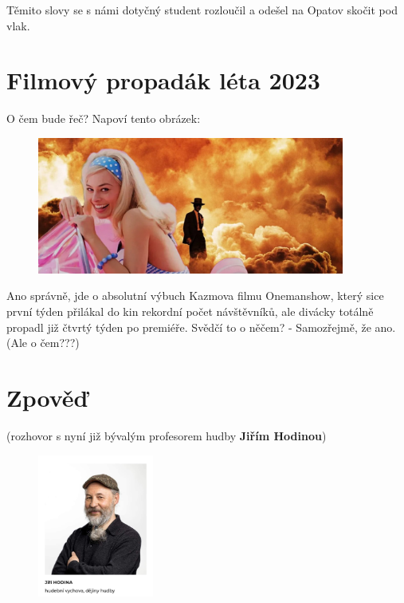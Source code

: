 \documentclass[twoside, 11pt]{article}
\begin{document}
Těmito slovy se s námi dotyčný student rozloučil a odešel na Opatov skočit pod vlak.

\section*{Filmový propadák léta 2023}
O čem bude řeč? Napoví tento obrázek:

\begin{figure}[htbp]
    \centering
    \includegraphics[width=0.9\textwidth]{barbie}
\end{figure}
\vspace*{-12pt}
{\scriptsize Ano správně, jde o absolutní výbuch Kazmova filmu Onemanshow, který sice první týden přilákal do kin rekordní počet návštěvníků, ale divácky totálně propadl již čtvrtý týden po premiéře. Svědčí to o něčem? - Samozřejmě, že ano. (Ale o čem???)}
\clearpage

\section*{Zpověď}
(rozhovor s nyní již bývalým profesorem hudby \textbf{Jiřím Hodinou})

\begin{figure}
    \vspace*{-4pt}
    \includegraphics[width=0.34\textwidth]{hodina}
\end{figure}
\end{document}
